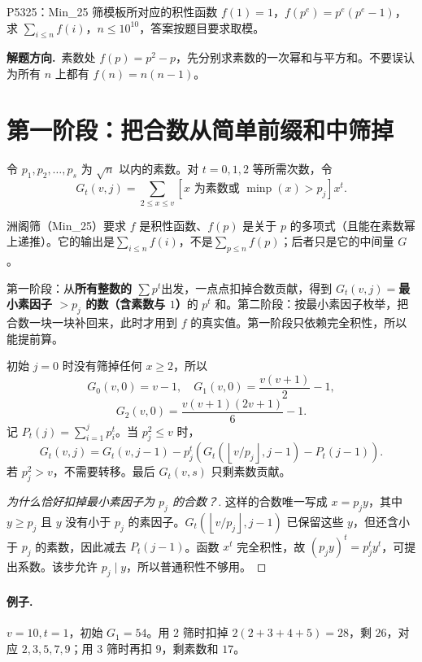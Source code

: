 \documentclass[UTF8,a4paper,11pt,twoside,openright,fontset=fandol]{ctexbook}
\theoremstyle{definition}
\newcommand{\floor}[1]{\left\lfloor #1\right\rfloor}
\newcommand{\hint}{\par\noindent\textbf{解题方向.}\ }
\begin{document}
\begin{problem}{P5325：Min\_25 筛模板所对应的积性函数}
$f(1)=1$，$f(p^e)=p^e(p^e-1)$，求 $\sum_{i\le n}f(i)$，$n\le10^{10}$，答案按题目要求取模。
\end{problem}
\hint 素数处 $f(p)=p^2-p$，先分别求素数的一次幂和与平方和。不要误认为所有 $n$ 上都有 $f(n)=n(n-1)$。

\section{第一阶段：把合数从简单前缀和中筛掉}
令 $p_1,p_2,\ldots,p_s$ 为 $\sqrt n$ 以内的素数。对 $t=0,1,2$ 等所需次数，令
\[
 G_t(v,j)=\sum_{2\le x\le v}
 [x\text{ 为素数或 }\operatorname{minp}(x)>p_j]x^t.
\]

\begin{tip}[前提：洲阁筛的要求与它的输出]
洲阁筛（Min\_25）要求 $f$ 是积性函数、$f(p)$ 是关于 $p$ 的多项式（且能在素数幂上递推）。它的输出是\textbf{$\sum_{i\le n}f(i)$}，不是\textbf{$\sum_{p\le n}f(p)$}；后者只是它的中间量 $G$。
\end{tip}

\begin{tip}[两阶段各自在做什么]
第一阶段：从\textbf{所有整数的 $\sum p^t$}出发，一点点扣掉合数贡献，得到 $G_t(v,j)=$\textbf{最小素因子 $>p_j$ 的数（含素数与 $1$）}的 $p^t$ 和。第二阶段：按最小素因子枚举，把合数一块一块补回来，此时才用到 $f$ 的真实值。第一阶段只依赖完全积性，所以能提前算。
\end{tip}

初始 $j=0$ 时没有筛掉任何 $x\ge2$，所以
\[
G_0(v,0)=v-1,\quad G_1(v,0)=\frac{v(v+1)}2-1,
\]
\[
G_2(v,0)=\frac{v(v+1)(2v+1)}6-1.
\]
记 $P_t(j)=\sum_{i=1}^jp_i^t$。当 $p_j^2\le v$ 时，
\[
 G_t(v,j)=G_t(v,j-1)-p_j^t
 \left(G_t(\floor{v/p_j},j-1)-P_t(j-1)\right).
\]
若 $p_j^2>v$，不需要转移。最后 $G_t(v,s)$ 只剩素数贡献。


\begin{proof}[为什么恰好扣掉最小素因子为 $p_j$ 的合数？]
这样的合数唯一写成 $x=p_jy$，其中 $y\ge p_j$ 且 $y$ 没有小于 $p_j$ 的素因子。$G_t(\floor{v/p_j},j-1)$ 已保留这些 $y$，但还含小于 $p_j$ 的素数，因此减去 $P_t(j-1)$。函数 $x^t$ 完全积性，故 $(p_jy)^t=p_j^ty^t$，可提出系数。该步允许 $p_j\mid y$，所以普通积性不够用。
\end{proof}
\paragraph{例子.} $v=10,t=1$，初始 $G_1=54$。用 $2$ 筛时扣掉 $2(2+3+4+5)=28$，剩 $26$，对应 $2,3,5,7,9$；用 $3$ 筛时再扣 $9$，剩素数和 $17$。
\end{document}
